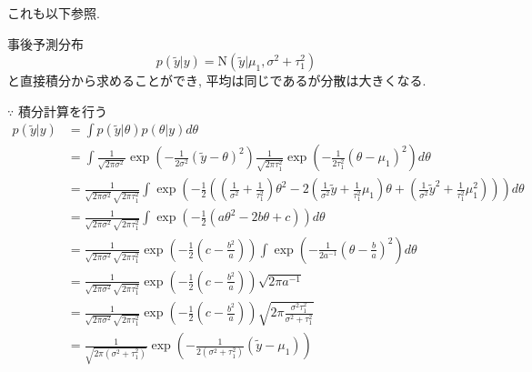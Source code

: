 \documentclass[11pt,a4pape,dvipdfmx]{jarticle}
\newcommand{\eqn}[1]{\begin{align*}#1\end{align*}}
\begin{document}
これも以下参照.


\begin{itembox}[l]{事後予測分布}
\[p(\tilde{y}|y)=\text{N}(\tilde{y}|\mu_1,\sigma^2+\tau^2_1)\]
と直接積分から求めることができ, 平均は同じであるが分散は大きくなる.
\end{itembox}
$\because$
積分計算を行う
\eqn{p(\tilde{y}|y)
&=\int p(\tilde{y}|\theta)p(\theta|y) d\theta\\
&=\int \frac{1}{\sqrt{2\pi\sigma^2}}\exp \left(-\tfrac{1}{2\sigma^2}(\tilde{y}-\theta)^2\right)\frac{1}{\sqrt{2\pi\tau_1^2}} \exp \left(-\tfrac{1}{2\tau_1^2}(\theta-\mu_1)^2\right)d\theta\\
&= \frac{1}{\sqrt{2\pi\sigma^2}\sqrt{2\pi\tau_1^2}}\int \exp \left(-\tfrac{1}{2} \left( \left( \tfrac{1}{\sigma^2}+\tfrac{1}{\tau_1^2}\right)\theta^2-2\left(\tfrac{1}{\sigma^2}\tilde{y}+\tfrac{1}{\tau_1^2}\mu_1\right)\theta+\left(\tfrac{1}{\sigma^2}\tilde{y}^2+\tfrac{1}{\tau_1^2}\mu_1^2\right)\right)\right)d\theta\\
&= \frac{1}{\sqrt{2\pi\sigma^2}\sqrt{2\pi\tau_1^2}}\int \exp \left(-\tfrac{1}{2} \left(a\theta^2-2b\theta+c\right)\right)d\theta\\
&= \frac{1}{\sqrt{2\pi\sigma^2}\sqrt{2\pi\tau_1^2}}\exp\left(-\tfrac{1}{2}\left(c-\tfrac{b^2}{a}\right)\right) \int \exp \left(-\tfrac{1}{2a^{-1}}\left(\theta-\tfrac{b}{a}\right)^2 \right)d\theta\\
&= \frac{1}{\sqrt{2\pi\sigma^2}\sqrt{2\pi\tau_1^2}}\exp\left(-\tfrac{1}{2}\left(c-\tfrac{b^2}{a}\right)\right) \sqrt{2\pi a^{-1}}\\
&= \frac{1}{\sqrt{2\pi\sigma^2}\sqrt{2\pi\tau_1^2}}\exp\left(-\tfrac{1}{2}\left(c-\tfrac{b^2}{a}\right)\right) \sqrt{2\pi \tfrac{\sigma^2\tau_1^2}{\sigma^2+\tau_1^2}}\\
&= \frac{1}{\sqrt{2\pi(\sigma^2+\tau_1^2)}}\exp\left(-\tfrac{1}{2(\sigma^2+\tau_1^2)}\left(\tilde{y}-\mu_1\right)\right)}
\end{document}
